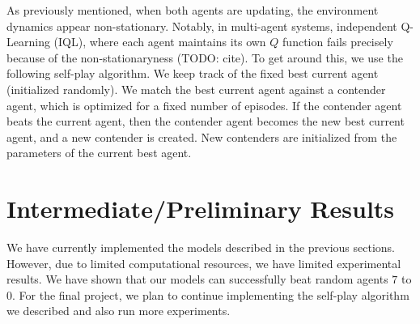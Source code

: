 \documentclass[10pt,twocolumn,letterpaper]{article}
\begin{document}
As previously mentioned, when both agents are updating, the environment
dynamics appear non-stationary. Notably, in multi-agent systems, independent
Q-Learning (IQL), where each agent maintains its own $Q$ function fails
precisely because of the non-stationaryness (TODO: cite).  To get around this,
we use the following self-play algorithm. We keep track of the fixed best
current agent (initialized randomly). We match the best current agent against
a contender agent, which is optimized for a fixed number of episodes. If the
contender agent beats the current agent, then the contender agent becomes the
new best current agent, and a new contender is created. New contenders are
initialized from the parameters of the current best agent.

\section{Intermediate/Preliminary Results}

We have currently implemented the models described in the previous sections.
However, due to limited computational resources, we have limited experimental
results. We have shown that our models can successfully beat random agents $7$
to $0$. For the final project, we plan to continue implementing the self-play
algorithm we described and also run more experiments.

{\small


}
\end{document}
